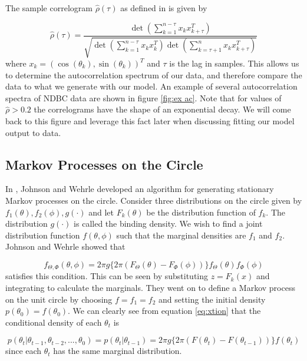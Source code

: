 \documentclass[12pt]{article}
\numberwithin{equation}{section}
\numberwithin{figure}{section}
\begin{document}
The sample correlogram $\hat{\rho}(\tau)$ as defined in \cite{fisher} is given by 

\begin{equation}\label{eq:sample ac}
\hat{\rho}(\tau) = \frac{\det\left(\sum_{k=1}^{n-\tau}x_k x_{k+\tau}^T \right)}{\sqrt{\det\left(\sum_{k=1}^{n-\tau}x_k x_{k}^T \right)\det\left(\sum_{k=\tau+1}^{n}x_k x_{k+\tau}^T \right)}}
\end{equation}
where $x_k = \left(\cos(\theta_k),\sin(\theta_k)\right)^T$ and $\tau$ is the lag in samples. This allows us to determine the autocorrelation spectrum of our data, and therefore compare the data to what we generate with our model. An example of several autocorrelation spectra of NDBC data are shown in figure \ref{fig:ex ac}. Note that for values of $\hat{\rho}>0.2$ the correlograms have the shape of an exponential decay. We will come back to this figure and leverage this fact later when discussing fitting our model output to data.

\subsection{Markov Processes on the Circle }

In \cite{Johnson} , Johnson and Wehrle developed an algorithm for generating stationary Markov processes on the circle. Consider three distributions on the circle given by $f_1(\theta),f_2(\phi), g(\cdot)$ and let $F_k(\theta)$ be the distribution function of $f_k$. The distribution $g(\cdot)$ is called the binding density. We wish to find a joint distribution function $f(\theta, \phi)$ such that the marginal densities are $f_1$ and $f_2$. Johnson and Wehrle showed that 

\begin{equation}\label{eq:xtion}
 f_{\Theta, \Phi}(\theta, \phi) = 2\pi g\{ 2\pi(F_{\Theta}(\theta)  -  F_\Phi(\phi)) \}f_\Theta(\theta)f_\Phi(\phi)
\end{equation}
satisfies this condition. This can be seen by substituting $z = F_k( x )$ and integrating to calculate the marginals. They went on to define a Markov process on the unit circle by choosing $f=f_1=f_2$ and setting the initial density $p(\theta_0) = f(\theta_0)$. We can clearly see from equation \ref{eq:xtion} that the conditional density of each $\theta_t$ is 

\begin{equation} \label{eq:xdensity}
p(\theta_t | \theta_{t-1}, \theta_{t-2}, ..., \theta_0) = p(\theta_t | \theta_{t-1} )=  2\pi g\{2\pi( F(\theta_t)  -  F(\theta_{t-1})) \}f(\theta_t)
\end{equation}
since each $\theta_t$ has the same marginal distribution.
\end{document}
